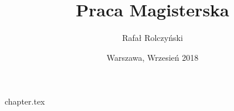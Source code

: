 \documentclass{report}
\title{ \bf Praca Magisterska}
\author{Rafał Rolczyński}
\date{Warszawa, Wrzesień 2018}
\begin{document}
%
%

{chapter.tex}
%
%

% 
% 
% 
% 
% 

\end{document}
